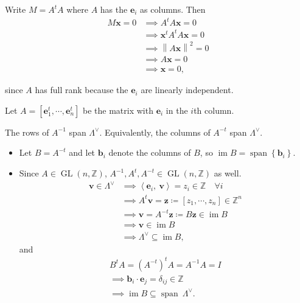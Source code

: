 \begin{solution}[Alternative]

Write \(M = A^tA\) where \(A\) has the \(\mathbf{e}_i\) as columns. Then
\begin{align*}
M\mathbf{x} = 0 
&\implies A^t A \mathbf{x} = 0 \\
&\implies \mathbf{x}^t A^t A \mathbf{x} = 0 \\
&\implies {\left\lVert {A \mathbf{x}} \right\rVert}^2  = 0 \\
&\implies A\mathbf{x} = 0 \\
&\implies \mathbf{x} = 0
,\end{align*}

since \(A\) has full rank because the \(\mathbf{e}_i\) are linearly
independent.

Let \(A = [\mathbf{e}_1^t, \cdots, \mathbf{e}_n^t]\) be the matrix with
\(\mathbf{e}_i\) in the \(i\)th column.

\begin{claim}

The rows of \(A^{-1}\) span \(\Lambda^\vee\). Equivalently, the columns
of \(A^{-t}\) span \(\Lambda^\vee\).

\end{claim}

\begin{itemize}
\item
  Let \(B = A^{-t}\) and let \(\mathbf{b}_i\) denote the columns of
  \(B\), so
  \(\operatorname{im}B = {\operatorname{span}}{\left\{{\mathbf{b}_i}\right\}}\).
\item
  Since \(A \in \operatorname{GL}(n, {\mathbb{Z}})\),
  \(A^{-1}, A^t, A^{-t} \in \operatorname{GL}(n, {\mathbb{Z}})\) as
  well.
  \begin{align*}
  \mathbf{v} \in \Lambda^\vee
  &\implies {\left\langle {\mathbf{e}_i},~{\mathbf{v}} \right\rangle} = z_i \in {\mathbb{Z}}\quad \forall i \\
  &\implies A^t \mathbf{v} = \mathbf{z} \coloneqq[z_1, \cdots, z_n] \in {\mathbb{Z}}^n \\
  &\implies \mathbf{v} = A^{-t} \mathbf{z} \coloneqq B\mathbf{z} \in \operatorname{im}B \\
  &\implies \mathbf{v} \in \operatorname{im}B \\
  &\implies \Lambda^\vee\subseteq \operatorname{im}B
  ,\end{align*}
  and
  \begin{align*}
  B^t A = (A^{-t})^t A = A^{-1}A = I \\
  \implies \mathbf{b}_i \cdot \mathbf{e}_j = \delta_{ij} \in {\mathbb{Z}}\\
  \implies \operatorname{im}B \subseteq {\operatorname{span}}~ \Lambda^\vee
  .\end{align*}
\end{itemize}

\end{solution}

